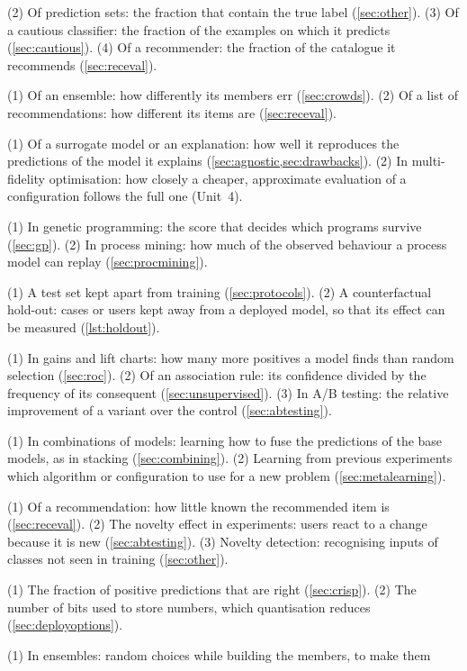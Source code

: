 \begin{description}
(2) Of prediction sets: the fraction that contain the true label (\cref{sec:other}). (3) Of a cautious
classifier: the fraction of the examples on which it predicts (\cref{sec:cautious}). (4) Of a
recommender: the fraction of the catalogue it recommends (\cref{sec:receval}).
\item[Diversity] (1) Of an ensemble: how differently its members err (\cref{sec:crowds}). (2) Of a
list of recommendations: how different its items are (\cref{sec:receval}).
\item[Fidelity] (1) Of a surrogate model or an explanation: how well it reproduces the predictions
of the model it explains (\cref{sec:agnostic,sec:drawbacks}). (2) In multi-fidelity optimisation:
how closely a cheaper, approximate evaluation of a configuration follows the full one (Unit~4).
\item[Fitness] (1) In genetic programming: the score that decides which programs survive
(\cref{sec:gp}). (2) In process mining: how much of the observed behaviour a process model can replay
(\cref{sec:procmining}).
\item[Hold-out] (1) A test set kept apart from training (\cref{sec:protocols}). (2) A counterfactual
hold-out: cases or users kept away from a deployed model, so that its effect can be measured
(\cref{lst:holdout}).
\item[Lift] (1) In gains and lift charts: how many more positives a model finds than random
selection (\cref{sec:roc}). (2) Of an association rule: its confidence divided by the frequency of its
consequent (\cref{sec:unsupervised}). (3) In A/B testing: the relative improvement of a variant over
the control (\cref{sec:abtesting}).
\item[Metalearning] (1) In combinations of models: learning how to fuse the predictions of the base
models, as in stacking (\cref{sec:combining}). (2) Learning from previous experiments which algorithm or
configuration to use for a new problem (\cref{sec:metalearning}).
\item[Novelty] (1) Of a recommendation: how little known the recommended item is
(\cref{sec:receval}). (2) The novelty effect in experiments: users react to a change because it is new
(\cref{sec:abtesting}). (3) Novelty detection: recognising inputs of classes not seen in training
(\cref{sec:other}).
\item[Precision] (1) The fraction of positive predictions that are right (\cref{sec:crisp}). (2) The
number of bits used to store numbers, which quantisation reduces (\cref{sec:deployoptions}).
\item[Randomisation] (1) In ensembles: random choices while building the members, to make them

\end{description}
